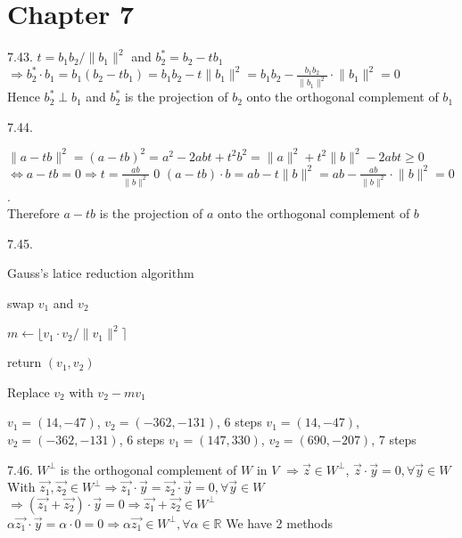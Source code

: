 \section{Chapter 7}

7.43. $t = b_1 b_2 / \lVert b_1 \rVert^2$ and $b_2^* = b_2 - tb_1$ \\ $\Rightarrow b_2^* \cdot b_1 = b_1 (b_2 - tb_1) = b_1 b_2 - t \lVert b_1 \rVert^2 = b_1 b_2 - \frac{b_1 b_2}{\lVert b_1 \rVert^2} \cdot \lVert b_1 \rVert^2 = 0$ \\ Hence $b_2^* \perp b_1$ and $b_2^*$ is the projection of $b_2$ onto the orthogonal complement of $b_1$


7.44.
	
		 $\lVert a - tb \rVert^2 = (a - tb)^2 = a^2 - 2abt + t^2b^2 = \lVert a\rVert^2 + t^2 \lVert b\rVert^2 - 2abt \geq 0$ \\ $\Leftrightarrow a - tb = 0 \Rightarrow t = \frac{ab}{\lVert b \rVert^2}$
		 0
		 $(a - tb)\cdot b = ab - t \lVert b \rVert^2 = ab - \frac{ab}{\lVert b \rVert^2} \cdot \lVert b \rVert^2 = 0$. \\ Therefore $a - tb$ is the projection of $a$ onto the orthogonal complement of $b$
	
7.45.
	\begin{algorithm}[ht]
		\caption{Gauss's latice reduction algorithm}
		\begin{algorithmic}

				swap $v_1$ and $v_2$	
			
				$m \gets \lfloor v_1 \cdot v_2 / \lVert v_1 \rVert^2 \rceil$
			\EndIf

				return $(v_1, v_2)$
			\EndIf

			Replace $v_2$ with $v_2 - mv_1$
			\EndWhile
		\end{algorithmic}
	
	\end{algorithm}
	
		 $v_1 = (14, -47)$, $v_2 = (-362, -131)$, 6 steps
		 $v_1 = (14, -47)$, $v_2 = (-362, -131)$, 6 steps
		 $v_1 = (147, 330)$, $v_2 = (690, -207)$, 7 steps
	


7.46.	
		 $W^\perp$ is the orthogonal complement of $W$ in $V$ $\Rightarrow \vec{z} \in W^\perp$, $\vec{z}\cdot\vec{y} = 0, \forall \vec{y} \in W$ \\ With $\vec{z_1}, \vec{z_2} \in W^\perp \Rightarrow \vec{z_1}\cdot\vec{y} = \vec{z_2}\cdot\vec{y} = 0, \forall \vec{y} \in W$ \\ $\Rightarrow (\vec{z_1} + \vec{z_2})\cdot\vec{y} = 0 \Rightarrow \vec{z_1} + \vec{z_2} \in W^\perp$ \\ $\alpha\vec{z_1}\cdot\vec{y} = \alpha \cdot 0 = 0 \Rightarrow \alpha\vec{z_1} \in W^\perp, \forall \alpha \in \mathbb{R}$
		 We have 2 methods
		
